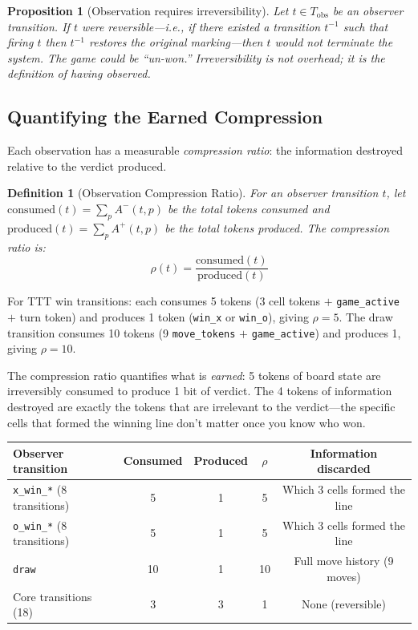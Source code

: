 \documentclass[11pt,a4paper]{article}
\newtheorem{definition}[theorem]{Definition}
\newtheorem{proposition}[theorem]{Proposition}
\begin{document}
\begin{proposition}[Observation requires irreversibility]
\label{prop:irreversible}
Let $t \in T_{\mathrm{obs}}$ be an observer transition.
If $t$ were reversible---i.e., if there existed a transition $t^{-1}$ such that firing $t$ then $t^{-1}$ restores the original marking---then $t$ would not terminate the system.
The game could be ``un-won.''
Irreversibility is not overhead; it is the definition of having observed.
\end{proposition}

\subsection{Quantifying the Earned Compression}

Each observation has a measurable \emph{compression ratio}: the information destroyed relative to the verdict produced.

\begin{definition}[Observation Compression Ratio]
\label{def:ratio}
For an observer transition $t$, let $\mathrm{consumed}(t) = \sum_{p} A^-(t, p)$ be the total tokens consumed and $\mathrm{produced}(t) = \sum_{p} A^+(t, p)$ be the total tokens produced.
The \emph{compression ratio} is:
\[
  \rho(t) = \frac{\mathrm{consumed}(t)}{\mathrm{produced}(t)}
\]
\end{definition}

For TTT win transitions: each consumes 5 tokens (3 cell tokens $+$ \texttt{game\_active} $+$ turn token) and produces 1 token (\texttt{win\_x} or \texttt{win\_o}), giving $\rho = 5$.
The draw transition consumes 10 tokens (9 \texttt{move\_tokens} $+$ \texttt{game\_active}) and produces 1, giving $\rho = 10$.

The compression ratio quantifies what is \emph{earned}: 5 tokens of board state are irreversibly consumed to produce 1 bit of verdict.
The 4 tokens of information destroyed are exactly the tokens that are irrelevant to the verdict---the specific cells that formed the winning line don't matter once you know who won.

\begin{center}
\begin{tabular}{@{}lcccc@{}}
\toprule
\textbf{Observer transition} & \textbf{Consumed} & \textbf{Produced} & $\rho$ & \textbf{Information discarded} \\
\midrule
\texttt{x\_win\_*} (8 transitions) & 5 & 1 & 5 & Which 3 cells formed the line \\
\texttt{o\_win\_*} (8 transitions) & 5 & 1 & 5 & Which 3 cells formed the line \\
\texttt{draw} & 10 & 1 & 10 & Full move history (9 moves) \\
\midrule
Core transitions (18) & 3 & 3 & 1 & None (reversible) \\
\bottomrule
\end{tabular}
\end{center}
\end{document}
